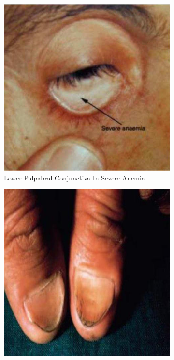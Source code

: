 \documentclass[a4paper,12pt,openany,oneside]{book}
\begin{document}
{\begin{figure}[h]
\begin{subfigure}[t]{.23\textwidth}
																	\includegraphics[width=\textwidth]{./clinicalPhysioPic/pallor2.jpg}
																	\caption{Lower Palpabral Conjunctiva In Severe Anemia}
																	\label{pallor}
																\end{subfigure}
																\hspace{\fill}
																\begin{subfigure}[t]{.23\textwidth}
																	\centering
																	\includegraphics[width=\textwidth]{./clinicalPhysioPic/koilonychia.jpg}

\end{subfigure}
\end{figure}}
\end{document}
